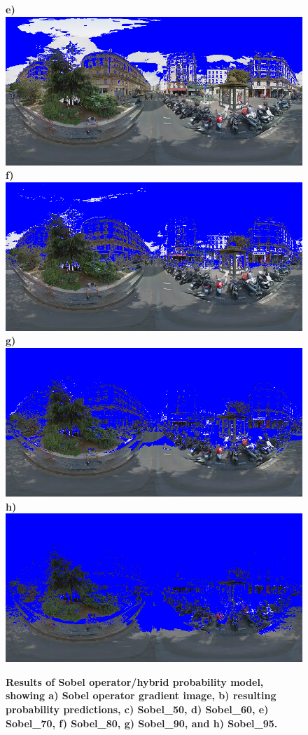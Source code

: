 \documentclass[final,3p,times,authoryear]{elsarticle}
\begin{document}
\begin{figure}
\textbf{e)}\includegraphics[scale=0.24]{Images/2/panorama-JtVHmEl7WCiz1xJ0bcJpBg-1_Sobel_80_marked.png} 
\textbf{f)}\includegraphics[scale=0.24]{Images/2/panorama-JtVHmEl7WCiz1xJ0bcJpBg-1_Sobel_70_marked.png} 
\textbf{g)}\includegraphics[scale=0.24]{Images/2/panorama-JtVHmEl7WCiz1xJ0bcJpBg-1_Sobel_60_marked.png} 
\textbf{h)}\includegraphics[scale=0.24]{Images/2/panorama-JtVHmEl7WCiz1xJ0bcJpBg-1_Sobel_50_marked.png} 
\caption{\bf  Results of Sobel operator/hybrid probability model, showing a) Sobel operator gradient image, b) resulting probability predictions, c) Sobel\_50, d) Sobel\_60, e) Sobel\_70, f) Sobel\_80, g) Sobel\_90, and h) Sobel\_95.}    
 \label{fig:sobolresults}  
\end{figure} 
\end{document}
